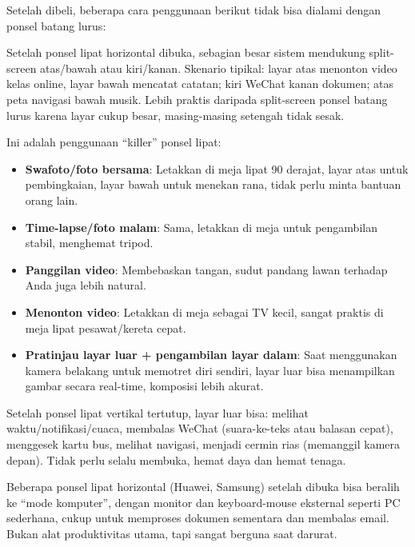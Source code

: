 
Setelah dibeli, beberapa cara penggunaan berikut tidak bisa dialami dengan ponsel batang lurus:


Setelah ponsel lipat horizontal dibuka, sebagian besar sistem mendukung split-screen atas/bawah atau kiri/kanan. Skenario tipikal: layar atas menonton video kelas online, layar bawah mencatat catatan; kiri WeChat kanan dokumen; atas peta navigasi bawah musik. Lebih praktis daripada split-screen ponsel batang lurus karena layar cukup besar, masing-masing setengah tidak sesak.


Ini adalah penggunaan “killer” ponsel lipat:

\begin{itemize}
  \item \textbf{Swafoto/foto bersama}: Letakkan di meja lipat 90 derajat, layar atas untuk pembingkaian, layar bawah untuk menekan rana, tidak perlu minta bantuan orang lain.
  \item \textbf{Time-lapse/foto malam}: Sama, letakkan di meja untuk pengambilan stabil, menghemat tripod.
  \item \textbf{Panggilan video}: Membebaskan tangan, sudut pandang lawan terhadap Anda juga lebih natural.
  \item \textbf{Menonton video}: Letakkan di meja sebagai TV kecil, sangat praktis di meja lipat pesawat/kereta cepat.
  \item \textbf{Pratinjau layar luar + pengambilan layar dalam}: Saat menggunakan kamera belakang untuk memotret diri sendiri, layar luar bisa menampilkan gambar secara real-time, komposisi lebih akurat.
\end{itemize}


Setelah ponsel lipat vertikal tertutup, layar luar bisa: melihat waktu/notifikasi/cuaca, membalas WeChat (suara-ke-teks atau balasan cepat), menggesek kartu bus, melihat navigasi, menjadi cermin rias (memanggil kamera depan). Tidak perlu selalu membuka, hemat daya dan hemat tenaga.


Beberapa ponsel lipat horizontal (Huawei, Samsung) setelah dibuka bisa beralih ke “mode komputer”, dengan monitor dan keyboard-mouse eksternal seperti PC sederhana, cukup untuk memproses dokumen sementara dan membalas email. Bukan alat produktivitas utama, tapi sangat berguna saat darurat.

